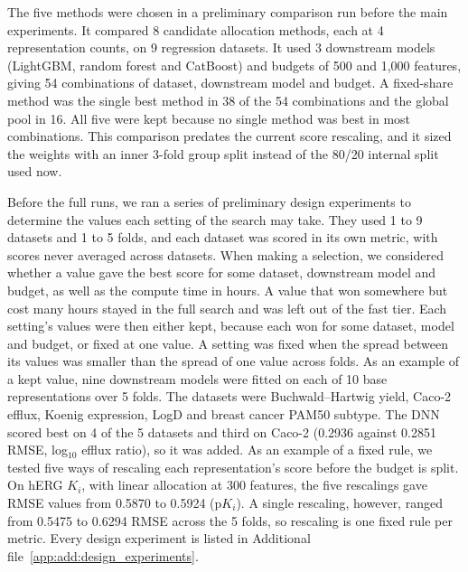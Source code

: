 The five methods were chosen in a preliminary comparison run before the main experiments. It compared 8 candidate allocation methods, each at 4 representation counts, on 9 regression datasets. It used 3 downstream models (LightGBM, random forest and CatBoost) and budgets of 500 and 1,000 features, giving 54 combinations of dataset, downstream model and budget. A fixed-share method was the single best method in 38 of the 54 combinations and the global pool in 16. All five were kept because no single method was best in most combinations. This comparison predates the current score rescaling, and it sized the weights with an inner 3-fold group split instead of the 80/20 internal split used now.

Before the full runs, we ran a series of preliminary design experiments to determine the values each setting of the search may take. They used 1 to 9 datasets and 1 to 5 folds, and each dataset was scored in its own metric, with scores never averaged across datasets. When making a selection, we considered whether a value gave the best score for some dataset, downstream model and budget, as well as the compute time in hours. A value that won somewhere but cost many hours stayed in the full search and was left out of the fast tier. Each setting's values were then either kept, because each won for some dataset, model and budget, or fixed at one value. A setting was fixed when the spread between its values was smaller than the spread of one value across folds. As an example of a kept value, nine downstream models were fitted on each of 10 base representations over 5 folds. The datasets were Buchwald--Hartwig yield, Caco-2 efflux, Koenig expression, LogD and breast cancer PAM50 subtype. The DNN scored best on 4 of the 5 datasets and third on Caco-2 (0.2936 against 0.2851 RMSE, log$_{10}$ efflux ratio), so it was added. As an example of a fixed rule, we tested five ways of rescaling each representation's score before the budget is split. On hERG $K_i$, with linear allocation at 300 features, the five rescalings gave RMSE values from 0.5870 to 0.5924 (p$K_i$). A single rescaling, however, ranged from 0.5475 to 0.6294 RMSE across the 5 folds, so rescaling is one fixed rule per metric. Every design experiment is listed in Additional file~\ref{app:add:design_experiments}.

